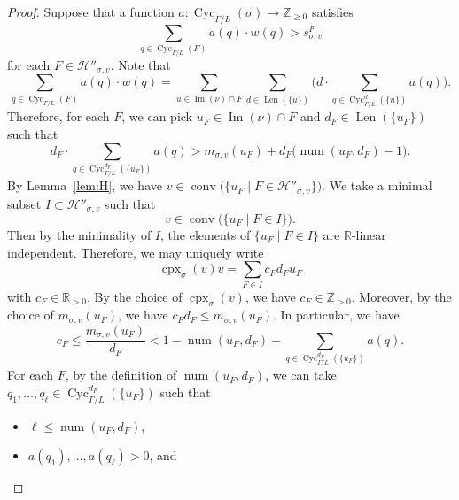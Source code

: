 \begin{proof}
Suppose that a function $a: \operatorname{Cyc}_{\Gamma /L}(\sigma) \to \mathbb{Z}_{\ge 0}$ satisfies 
\[
\sum _{q \in \operatorname{Cyc}_{\Gamma /L}(F)} a(q) \cdot w(q) > s^{F} _{\sigma, v}
\]
for each $F \in \mathcal{H}'' _{\sigma, v}$. 
Note that 
\[
\sum _{q \in \operatorname{Cyc}_{\Gamma /L}(F)} a(q) \cdot w(q) = 
\sum_{u \in \operatorname{Im}(\nu) \cap F} 
\sum_{d \in \operatorname{Len} (\{ u \})}
\Biggl( d \cdot \sum _{q \in \operatorname{Cyc}_{\Gamma /L}^{d} (\{ u \})} a(q) \Biggr). 
\]
Therefore, for each $F$, we can pick $u_F \in \operatorname{Im}(\nu) \cap F$ and $d_F \in \operatorname{Len} (\{ u_F \})$ such that 
\[
d_F \cdot \sum _{q \in \operatorname{Cyc}_{\Gamma /L}^{d_F} (\{ u_F \})} a(q) 
> m_{\sigma, v}(u_F) + d_F \bigl( \operatorname{num}(u_F, d_F) -1 \bigr). 
\]
By Lemma~\ref{lem:H}, we have
$v \in \operatorname{conv}\bigl( \{ u_F \mid F \in \mathcal{H}'' _{\sigma, v} \} \bigr)$. 
We take a minimal subset $I \subset \mathcal{H}'' _{\sigma, v}$ such that 
\[
v \in \operatorname{conv}\bigl( \{ u_{F} \mid F \in I \} \bigr). 
\]
Then by the minimality of $I$, the elements of $\{ u_{F} \mid F \in I \}$ are $\mathbb{R}$-linear independent. 
Therefore, we may uniquely write 
\[
\operatorname{cpx}_{\sigma}(v) v = \sum_{F \in I} c_F d_F u_{F} 
\]
with $c_F \in \mathbb{R}_{> 0}$. 
By the choice of $\operatorname{cpx}_{\sigma}(v)$, we have $c_F \in \mathbb{Z}_{> 0}$. 
Moreover, by the choice of $m_{\sigma, v}(u_{F})$, we have $c_F d_F \le m_{\sigma, v}(u_{F})$. 
In particular, we have 
\[
c_F \le \frac{m_{\sigma, v}(u_{F})}{d_F} 
< 1 - \operatorname{num}(u_F, d_F) + \sum _{q \in \operatorname{Cyc}_{\Gamma /L}^{d_F} (\{ u_F \})} a(q). 
\]
For each $F$, by the definition of $\operatorname{num}(u_F, d_F)$, we can take $q_1, \ldots , q_{\ell} \in  \operatorname{Cyc}_{\Gamma /L}^{d_F} (\{ u_F \})$ such that
\begin{itemize}
\item 
$\ell \le \operatorname{num}(u_F, d_F)$, 

\item 
$a(q_1), \ldots, a(q_{\ell}) > 0$, and 


\end{itemize}
\end{proof}

